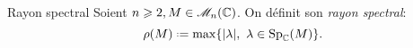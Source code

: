 \begin{defi}{Rayon spectral}
    Soient $n \geqslant 2, M \in \mathscr{M}_n(\mathbb{C})$. On définit son \emph{rayon spectral}:
    $$\rho(M) \defeq \max \{ |\lambda |,\ \lambda \in \Sp_{\C}(M) \}.$$
\end{defi}